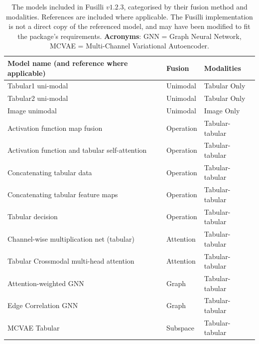 \begin{table}[!ht]
    \caption[The models included in Fusilli $v1.2.3$, categorised by their fusion method and modalities.]{The models included in Fusilli $v1.2.3$, categorised by their fusion method and modalities.
    References are included where applicable. The Fusilli implementation is not a direct copy of the referenced model, and may have been modified to fit the package's requirements.
    \textbf{Acronyms}: GNN = Graph Neural Network, MCVAE = Multi-Channel Variational Autoencoder.}
    \label{tab:fusillimodelslist}
    \centering
    \begin{tabular}{|p{8cm}ll|}
        \hline
        \textbf{Model name (and reference where applicable)} & \textbf{Fusion} & \textbf{Modalities} \\ \hline
        Tabular1 uni-modal & Unimodal & Tabular Only \\ \hline
        Tabular2 uni-modal & Unimodal & Tabular Only \\ \hline
        Image unimodal & Unimodal & Image Only \\ \hline
        Activation function map fusion~\cite{chenMDFNetApplicationMultimodal2023} & Operation & Tabular-tabular \\ \hline
        Activation function and tabular self-attention~\cite{chenMDFNetApplicationMultimodal2023} & Operation & Tabular-tabular \\ \hline
        Concatenating tabular data & Operation & Tabular-tabular \\ \hline 
        Concatenating tabular feature maps~\cite{gaoReducingUncertaintyCancer2022} & Operation & Tabular-tabular \\ \hline
        Tabular decision & Operation & Tabular-tabular \\ \hline 
        Channel-wise multiplication net (tabular)~\cite{duanmuPredictionPathologicalComplete2020}  & Attention & Tabular-tabular \\ \hline
        Tabular Crossmodal multi-head attention~\cite{golovanevskyMultimodalAttentionbasedDeep2022}  & Attention & Tabular-tabular \\ \hline
        Attention-weighted GNN~\cite{bintsiMultimodalBrainAge2023} & Graph & Tabular-tabular \\ \hline
        Edge Correlation GNN & Graph & Tabular-tabular \\ \hline 
        MCVAE Tabular~\cite{antelmiSparseMultiChannelVariational2019}  & Subspace & Tabular-tabular \\ \hline

\end{tabular}
\end{table}
